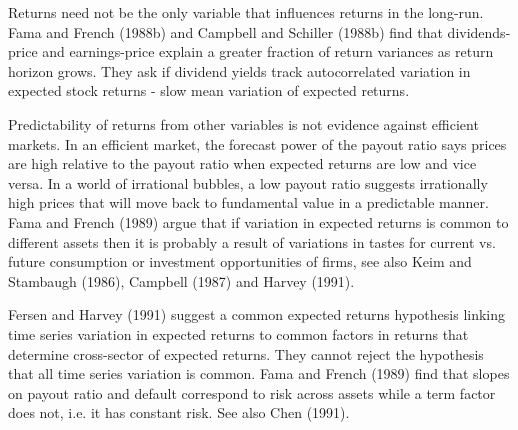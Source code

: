 Returns need not be the only variable that influences returns in the long-run. Fama and
French (1988b)\cite{fama1988dividend} and Campbell and Schiller
(1988b)\cite{campbell1988stock} find that dividends-price and earnings-price explain a
greater fraction of return variances as return horizon grows. They ask if dividend yields
track autocorrelated variation in expected stock returns - slow mean variation of expected
returns.

Predictability of returns from other variables is not evidence against efficient markets.
In an efficient market, the forecast power of the payout ratio says prices are high
relative to the payout ratio when expected returns are low and vice versa. In a world of
irrational bubbles, a low payout ratio suggests irrationally high prices that will move
back to fundamental value in a predictable manner. Fama and French
(1989)\cite{fama1989business} argue that if variation in expected returns is common to
different assets then it is probably a result of variations in tastes for current vs.
future consumption or investment opportunities of firms, see also Keim and Stambaugh
(1986)\cite{keim1986predicting}, Campbell (1987)\cite{campbell1987stock} and Harvey
(1991)\cite{harvey1991world}.

Fersen and Harvey (1991)\cite{ferson1991variation} suggest a common expected returns
hypothesis linking time series variation in expected returns to common factors in returns
that determine cross-sector of expected returns. They cannot reject the hypothesis that
all time series variation is common. Fama and French (1989)\cite{fama1989business} find
that slopes on payout ratio and default correspond to risk across assets while a term
factor does not, i.e. it has constant risk. See also Chen (1991)\cite{chen1991financial}.


